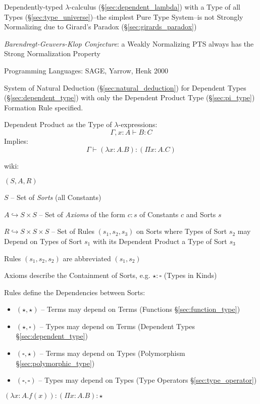 Dependently-typed $\lambda$-calculus (\S\ref{sec:dependent_lambda})
with a Type of all Types (\S\ref{sec:type_universe})--the simplest
Pure Type System--is not Strongly Normalizing due to Girard's Paradox
(\S\ref{sec:girards_paradox})

\emph{Barendregt-Geuvers-Klop Conjecture}: a Weakly Normalizing PTS
always has the Strong Normalization Property

Programming Languages: SAGE, Yarrow, Henk 2000


System of Natural Deduction (\S\ref{sec:natural_deduction}) for
Dependent Types (\S\ref{sec:dependent_type}) with only the Dependent
Product Type (\S\ref{sec:pi_type}) Formation Rule specified.

Dependent Product as the Type of $\lambda$-expressions:
\[
  \Gamma,x:A \vdash B:C
\]
Implies:
\[
  \Gamma \vdash (\lambda x:A.B):(\Pi x:A.C)
\]


\asterism


wiki:

$(S,A,R)$

$S$ -- Set of \emph{Sorts} (all Constants)

$A \hookrightarrow S \times S$ -- Set of \emph{Axioms} of the form
$c:s$ of Constants $c$ and Sorts $s$

$R \hookrightarrow S \times S \times S$ -- Set of Rules
$(s_1,s_2,s_3)$ on Sorts where Types of Sort $s_2$ may Depend on Types
of Sort $s_1$ with its Dependent Product a Type of Sort $s_3$

Rules $(s_1,s_2,s_2)$ are abbreviated
$(s_1,s_2)$

Axioms describe the Containment of Sorts, e.g. $\star:\square$ (Types
in Kinds)

Rules define the Dependencies between Sorts:
\begin{itemize}
  \item $(\star,\star)$ -- Terms may depend on Terms (Functions
    \S\ref{sec:function_type})
  \item $(\star,\square)$ -- Types may depend on Terms (Dependent
    Types \S\ref{sec:dependent_type})
  \item $(\square,\star)$ -- Terms may depend on Types (Polymorphism
    \S\ref{sec:polymorphic_type})
  \item $(\square,\square)$ -- Types may depend on Types (Type
    Operators \S\ref{sec:type_operator})
\end{itemize}

$(\lambda x:A.f(x)):(\Pi x:A.B):\star$

